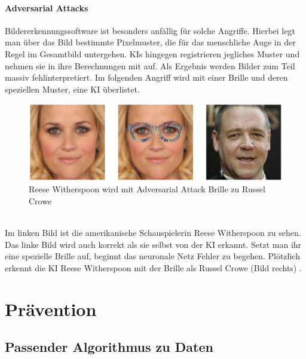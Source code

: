 \documentclass[12pt,oneside,a4paper,parskip]{scrbook}
\begin{document}
\subsubsection{Adversarial Attacks}
Bildererkennungssoftware ist besonders anfällig für solche Angriffe.
Hierbei legt man über das Bild bestimmte Pixelmuster, die für das menschliche Auge in der Regel im Gesamtbild untergehen. KIs hingegen registrieren jegliches Muster und nehmen sie in ihre Berechnungen mit auf. Als Ergebnis werden Bilder zum Teil massiv fehlinterpretiert.
Im folgenden Angriff wird mit einer Brille und deren speziellen Muster, eine KI überlistet.
\label{section:BrilleAttack}
\begin{figure}[h]
	\begin{center}
		\includegraphics[width=15cm]{Bilder/Brille_Adversarial_Attack.png}
		\caption{Reese Witherspoon wird mit Adversarial Attack Brille zu Russel Crowe}
		\label{fig:BrilleAttack}
	\end{center}
\end{figure}
\\Im linken Bild ist die amerikanische Schauspielerin Reese Witherspoon zu sehen. Das linke Bild wird auch korrekt als sie selbst von der KI erkannt. Setzt man ihr eine spezielle Brille auf, beginnt das neuronale Netz Fehler zu begehen. Plötzlich erkennt die KI Reese Witherspoon mit der Brille als Russel Crowe (Bild rechts) \cite{Attack}.

\chapter{Prävention}
\label{chapter:main}
\section{Passender Algorithmus zu Daten}
\end{document}
